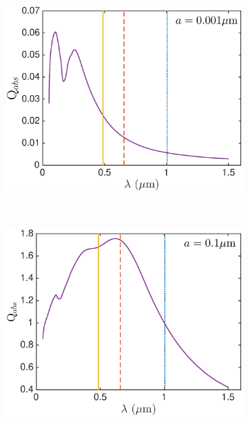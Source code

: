 \begin{figure}
\begin{subfigure}{\textwidth}
\centering
\includegraphics[trim =0 30 45 15,clip=true,scale=0.5]{chapters/chapter4/images/Qabs_a0_001}
\end{subfigure} \\[0.5ex]

\begin{subfigure}{\textwidth}
\centering

\includegraphics[trim =0 30 45 15,clip=true,scale=0.5]{chapters/chapter4/images/Qabs_a0_1} 
\end{subfigure} \\[0.5ex]


\end{figure}
